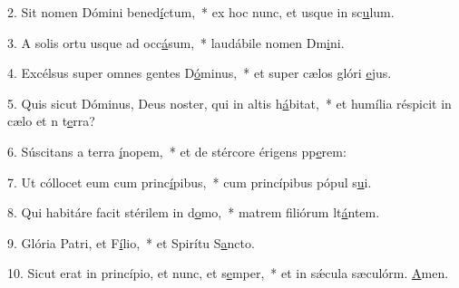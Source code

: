 2. Sit nomen Dómini bened\uline{í}ctum,~* ex hoc nunc, et usque in sc\uline{u}lum.\par 
3. A solis ortu usque ad occ\uline{á}sum,~* laudábile nomen Dm\uline{i}ni.\par 
4. Excélsus super omnes gentes D\uline{ó}minus,~* et super cælos glóri \uline{e}jus.\par 
5. Quis sicut Dóminus, Deus noster, qui in altis h\uline{á}bitat,~* et humília réspicit in cælo et n t\uline{e}rra?\par 
6. Súscitans a terra \uline{í}nopem,~* et de stércore érigens pp\uline{e}rem:\par 
7. Ut cóllocet eum cum princ\uline{í}pibus,~* cum princípibus pópul s\uline{u}i.\par 
8. Qui habitáre facit stérilem in d\uline{o}mo,~* matrem filiórum lt\uline{á}ntem.\par 
9. Glória Patri, et F\uline{í}lio,~* et Spirítu S\uline{a}ncto.\par 
10. Sicut erat in princípio, et nunc, et s\uline{e}mper,~* et in sǽcula sæculórm. \uline{A}men.\par 

